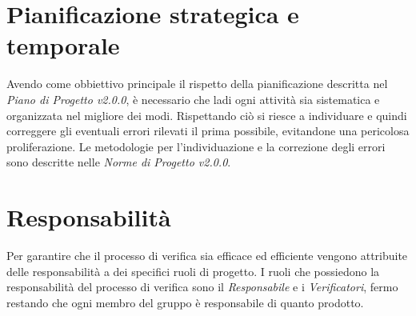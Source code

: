 \section{Pianificazione strategica e temporale}
Avendo come obbiettivo principale il rispetto della pianificazione descritta nel \textit{Piano di Progetto v2.0.0}, è necessario che ladi ogni attività sia sistematica e organizzata nel migliore dei modi. 
Rispettando ciò si riesce a individuare e quindi correggere gli eventuali errori rilevati il prima possibile, evitandone una pericolosa proliferazione. 
Le metodologie per l'individuazione e la correzione degli errori sono descritte nelle \textit{Norme di Progetto v2.0.0}.
\section{Responsabilità}
Per garantire che il processo di verifica sia efficace ed efficiente vengono attribuite delle responsabilità a dei specifici ruoli di progetto.
I ruoli che possiedono la responsabilità del processo di verifica sono il \textit{Responsabile} e i \textit{Verificatori}, fermo restando che ogni membro del gruppo è responsabile di quanto prodotto.
